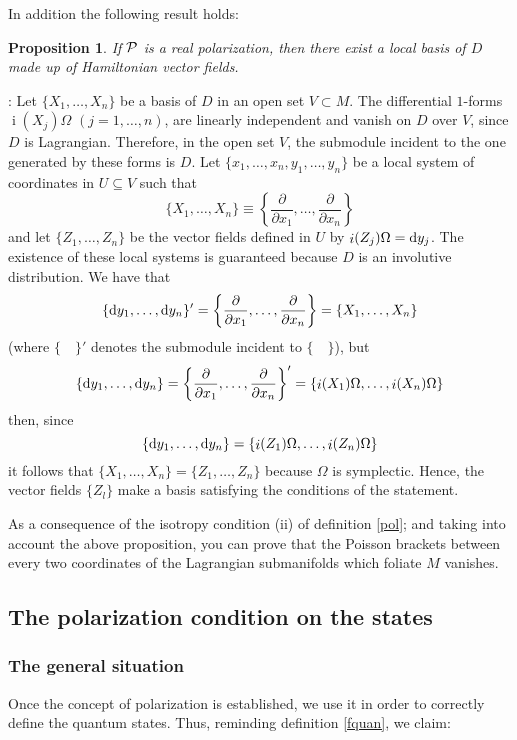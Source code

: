 \documentclass[12pt]{article}
\theoremstyle{plain}
\newtheorem{prop}{Proposition}
\def\derpar#1#2{\frac{\partial{#1}}{\partial{#2}}}
\def\qed{\ifvmode\removelastskip\fi
{\unskip\nobreak\hfil\penalty50\hbox{}\nobreak\hfil
\hbox{\vrule height1.2ex width1.2ex}\parfillskip=0pt
\finalhyphendemerits=0 \par\smallskip}}
\def\d{{\rm d}}
\def\inn{\mathop{i}\nolimits}
\begin{document}
In addition the following result holds:

\begin{prop}
If ${\cal P}$ is a real polarization,
then there exist a local basis of $D$
made up of Hamiltonian vector fields.
\label{blh}
\end{prop}
: 
Let $\{ X_1,\ldots ,X_n \}$ be a basis of $D$
in an open set $V \subset M$.
The differential $1$-forms
$\inn(X_j)\Omega$ $(j=1,\ldots ,n)$,
are linearly independent and vanish on $D$ over $V$,
since $D$ is Lagrangian.
Therefore, in the open set $V$, the submodule incident to the one
generated by these forms is $D$.
Let $\{ x_1,\ldots ,x_n,y_1,\ldots ,y_n \}$ be
a local system of coordinates in $U \subseteq V$ such that
$$
\{ X_1,\ldots ,X_n \} \equiv
\left\{ \derpar{}{x_1},\ldots ,\derpar{}{x_n} \right\}
$$
and let $\{ Z_1,\ldots ,Z_n \}$ be
the vector fields defined in $U$ by
$\inn(Z_j)\Omega =\d y_j$.
The existence of these local systems is guaranteed
because $D$ is an involutive distribution.
We have that
$$
\{ \d y_1,\ldots ,\d y_n \}' =
\left\{ \derpar{}{x_1},\ldots ,\derpar{}{x_n} \right\} =
\{ X_1,\ldots ,X_n \}
$$
(where $\{\quad \}'$ denotes the submodule incident to $\{\quad \}$),
but
$$
\{ \d y_1,\ldots ,\d y_n \} =
\left\{ \derpar{}{x_1},\ldots ,\derpar{}{x_n} \right\}' =
\{ \inn(X_1)\Omega ,\ldots ,\inn(X_n)\Omega \}
$$
then, since
$$
\{ \d y_1,\ldots ,\d y_n \} =
\{ \inn(Z_1)\Omega ,\ldots ,\inn(Z_n)\Omega \}
$$
it follows that $\{ X_1,\ldots ,X_n \} = \{ Z_1,\ldots ,Z_n \}$
because $\Omega$ is symplectic.
Hence, the vector fields $\{ Z_l \}$
make a basis satisfying the
conditions of the statement.
\qed

As a consequence of the isotropy condition (ii) of definition
\ref{pol}; and taking into account the above proposition,
you can prove that the Poisson brackets between every two coordinates
of the Lagrangian submanifolds which foliate $M$ vanishes.


\subsection{The polarization condition on the states}


\subsubsection{The general situation}


Once the concept of polarization is established,
we use it in order to correctly define the quantum states.
Thus, reminding definition \ref{fquan}, we claim:
\end{document}
